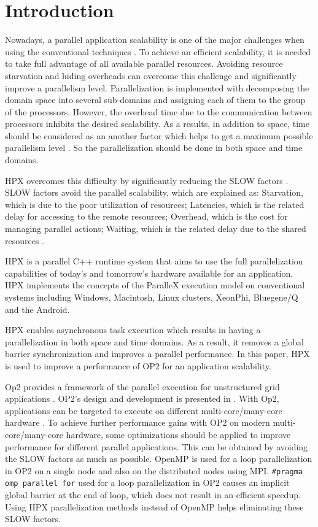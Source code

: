 \documentclass[conference]{IEEEtran}
\begin{document}
\section{Introduction}
Nowadays, a parallel application scalability is one of the major challenges when using the conventional techniques \cite{r11,r12}. To achieve an efficient scalability, it is needed to take full advantage of all available parallel resources. Avoiding resource starvation and hiding overheads can overcome this challenge and significantly improve a parallelism level. Parallelization is implemented with decomposing the domain space into several sub-domains and assigning each of them to the group of the processors. However, the overhead time due to the communication between processors inhibits the desired scalability. As a results, in addition to space, time should be considered as an another factor which helps to get a maximum possible parallelism level\cite{r7} \cite{r14}. So the parallelization should be done in both space and time domains. 

HPX \cite{r19} overcomes this difficulty by significantly reducing the SLOW factors \cite{r6}. SLOW factors avoid the parallel scalability, which are explained as: Starvation, which is due to the poor utilization of resources; Latencies, which is the related delay for accessing to the remote resources; Overhead, which is the cost for managing parallel actions; Waiting, which is the related delay due to the shared resources \cite{r7}. 

HPX is a parallel C++ runtime system that aims to use the full parallelization capabilities of today's and tomorrow's hardware available for an application. HPX implements the concepts of the ParalleX execution model \cite{o9,o10,o11} on conventional systems including Windows, Macintosh, Linux clusters, XeonPhi, Bluegene/Q and the Android. 

 HPX enables asynchronous task execution which results in having a parallelization in both space and time domains. As a result, it removes a global barrier synchronization and improves a parallel performance. In this paper, HPX is used to improve a performance of OP2 for an application scalability.

Op2 provides a framework of the parallel execution for unstructured grid applications \cite{o1}. OP2's design and development is presented in \cite{o2,o12}. With Op2, applications can be targeted to execute on different multi-core/many-core hardware \cite{o2,o3}. To achieve further performance gains with OP2 on modern multi-core/many-core hardware, some optimizations should be applied to improve performance for different parallel applications. This can be obtained by avoiding the SLOW factors as much as possible. OpenMP is used for a loop parallelization in OP2 on a single node and also on the distributed nodes using MPI. \texttt{\#pragma omp parallel for} used for a loop parallelization in OP2 causes an implicit global barrier at the end of loop, which does not result in an efficient speedup. Using HPX parallelization methods instead of OpenMP helps eliminating these SLOW factors.
\end{document}
